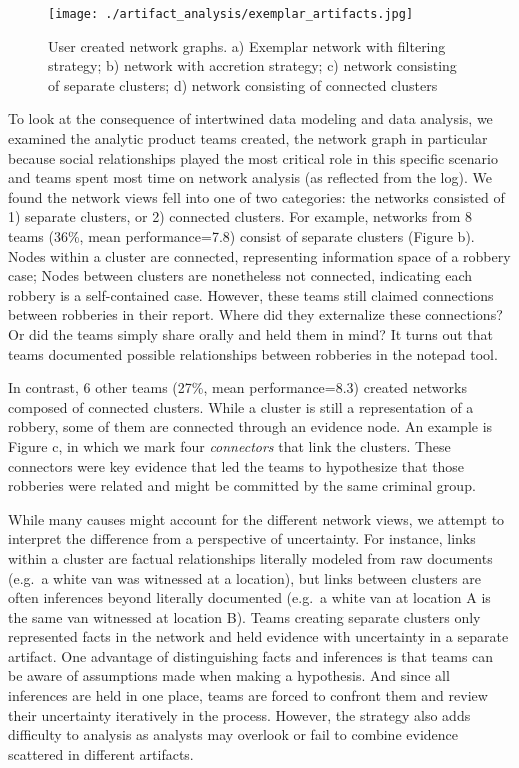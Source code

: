 \documentclass[]{article}
\begin{document}
\begin{figure}
\centering
\texttt{[image: ./artifact\_analysis/exemplar\_artifacts.jpg]}
\caption{User created network graphs. a) Exemplar network with filtering
strategy; b) network with accretion strategy; c) network consisting of
separate clusters; d) network consisting of connected
clusters\label{fig:network}}
\end{figure}

To look at the consequence of intertwined data modeling and data
analysis, we examined the analytic product teams created, the network
graph in particular because social relationships played the most
critical role in this specific scenario and teams spent most time on
network analysis (as reflected from the log). We found the network views
fell into one of two categories: the networks consisted of 1) separate
clusters, or 2) connected clusters. For example, networks from 8 teams
(36\%, mean performance=7.8) consist of separate clusters (Figure
\autocite{fig:network}b). Nodes within a cluster are connected,
representing information space of a robbery case; Nodes between clusters
are nonetheless not connected, indicating each robbery is a
self-contained case. However, these teams still claimed connections
between robberies in their report. Where did they externalize these
connections? Or did the teams simply share orally and held them in mind?
It turns out that teams documented possible relationships between
robberies in the notepad tool.

In contrast, 6 other teams (27\%, mean performance=8.3) created networks
composed of connected clusters. While a cluster is still a
representation of a robbery, some of them are connected through an
evidence node. An example is Figure \autocite{fig:network}c, in which we
mark four \emph{connectors} that link the clusters. These connectors
were key evidence that led the teams to hypothesize that those robberies
were related and might be committed by the same criminal group.

While many causes might account for the different network views, we
attempt to interpret the difference from a perspective of uncertainty.
For instance, links within a cluster are factual relationships literally
modeled from raw documents (e.g.~a white van was witnessed at a
location), but links between clusters are often inferences beyond
literally documented (e.g.~a white van at location A is the same van
witnessed at location B). Teams creating separate clusters only
represented facts in the network and held evidence with uncertainty in a
separate artifact. One advantage of distinguishing facts and inferences
is that teams can be aware of assumptions made when making a hypothesis.
And since all inferences are held in one place, teams are forced to
confront them and review their uncertainty iteratively in the process.
However, the strategy also adds difficulty to analysis as analysts may
overlook or fail to combine evidence scattered in different artifacts.
\end{document}
